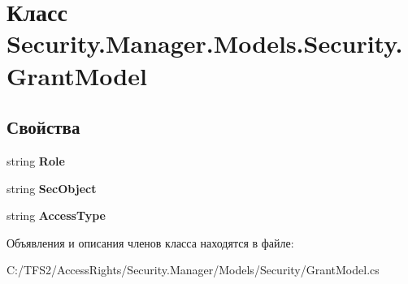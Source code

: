 \hypertarget{class_security_1_1_manager_1_1_models_1_1_security_1_1_grant_model}{}\section{Класс Security.\+Manager.\+Models.\+Security.\+Grant\+Model}
\label{class_security_1_1_manager_1_1_models_1_1_security_1_1_grant_model}
\subsection*{Свойства}
\begin{DoxyCompactItemize}
\item 
\mbox{\label{class_security_1_1_manager_1_1_models_1_1_security_1_1_grant_model_ad39245e1050df0d9b1f60a1ff7aba0ae}} 
string {\bfseries Role}
\item 
\mbox{\label{class_security_1_1_manager_1_1_models_1_1_security_1_1_grant_model_a31a271306d6d3df3b2f4da35e4d639f5}} 
string {\bfseries Sec\+Object}
\item 
\mbox{\label{class_security_1_1_manager_1_1_models_1_1_security_1_1_grant_model_a4b6df468a94ba62dfc7f4204de712e8e}} 
string {\bfseries Access\+Type}
\end{DoxyCompactItemize}


Объявления и описания членов класса находятся в файле\+:\begin{DoxyCompactItemize}
\item 
C\+:/\+T\+F\+S2/\+Access\+Rights/\+Security.\+Manager/\+Models/\+Security/Grant\+Model.\+cs\end{DoxyCompactItemize}
